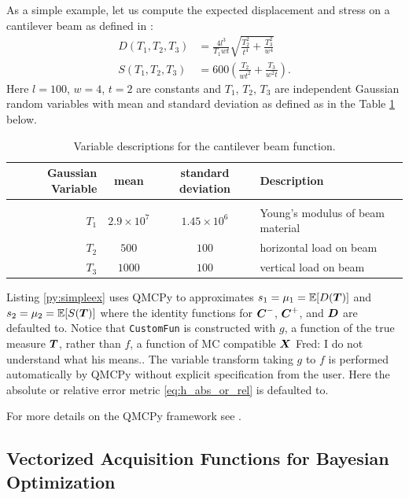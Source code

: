 \documentclass{article}[12pt]
\newcommand{\FJHComment}[1]{{\color{purple}Fred:  #1}}
\begin{document}
As a simple example, let us compute the expected displacement and stress on a cantilever beam as defined in \cite{ simulationlib_cantilever}: 
\begin{align*}
    D(T_1,T_2,T_3) &= \frac{4l^3}{T_1 w t} \sqrt{\frac{T_2^2}{t^4} + \frac{T_3^2}{w^4}} \\ 
    S(T_1,T_2,T_3) &= 600\left(\frac{T_2}{wt^2} + \frac{T_3}{w^2t}\right).
    \label{eq:cantilever_beam}
\end{align*}
Here $l=100$, $w=4$, $t=2$ are constants and $T_1$, $T_2$, $T_3$ are independent Gaussian random variables with mean and standard deviation as defined as in the Table \ref{tab:cantilever_beam} below.
\begin{table}[H]
    \centering
    \begin{tabular}{r c c l}
        Gaussian Variable & mean & standard deviation & Description \\ 
        \hline \\
        $T_1$ & $2.9 \times 10^7$ & $1.45 \times 10^6$ & Young's modulus of beam material \\
        $T_2$ & $500$ & $100$ & horizontal load on beam \\
        $T_3$ & $1000$ & $100$ & vertical load on beam
    \end{tabular}
    \caption{Variable descriptions for the cantilever beam function.}
    \label{tab:cantilever_beam}
\end{table}
Listing \ref{py:simpleex} uses QMCPy to approximates $s_1 = \mu_1 = \mathbb{E}[D(\boldsymbol{T})]$ and $s_2 = \mu_2 = \mathbb{E}[S(\boldsymbol{T})]$ where the identity functions for $\boldsymbol{C}^-$, $\boldsymbol{C}^+$, and $\boldsymbol{D}$ are defaulted to. Notice that \texttt{CustomFun} is constructed with $g$, a function of the true measure $\boldsymbol{T}$, rather than $f$, a function of MC compatible $\boldsymbol{X}$ \FJHComment{I do not understand what his means.}. The variable transform taking $g$ to $f$ is performed automatically by QMCPy without explicit specification from the user. Here the absolute or relative error metric \eqref{eq:h_abs_or_rel} is defaulted to.

For more details on the QMCPy framework see \cite{QMCSoftware}.

\subsection{Vectorized Acquisition Functions for Bayesian Optimization}
\end{document}

